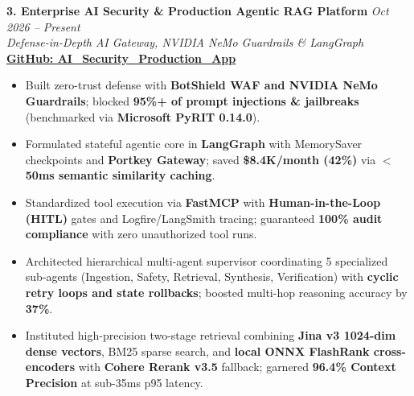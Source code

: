 \documentclass[9.5pt,a4paper]{article}
\begin{document}
\vspace{2.0pt}
\noindent\textbf{3. Enterprise AI Security \& Production Agentic RAG Platform} \hfill {\small\textit{Oct 2026 -- Present}}\\
\textit{Defense-in-Depth AI Gateway, NVIDIA NeMo Guardrails \& LangGraph} \hfill {\footnotesize\href{https://github.com/KishorKumarParoi/AI_Security_Production_App}{\textbf{GitHub: AI\_Security\_Production\_App}}}
\begin{itemize}
    \item Built zero-trust defense with \textbf{BotShield WAF and NVIDIA NeMo Guardrails}; blocked \textbf{95\%+ of prompt injections \& jailbreaks} (benchmarked via \textbf{Microsoft PyRIT 0.14.0}).
    \item Formulated stateful agentic core in \textbf{LangGraph} with MemorySaver checkpoints and \textbf{Portkey Gateway}; saved \textbf{\$8.4K/month (42\%)} via \textbf{$<$50ms semantic similarity caching}.
    \item Standardized tool execution via \textbf{FastMCP} with \textbf{Human-in-the-Loop (HITL)} gates and Logfire/LangSmith tracing; guaranteed \textbf{100\% audit compliance} with zero unauthorized tool runs.
    \item Architected hierarchical multi-agent supervisor coordinating 5 specialized sub-agents (Ingestion, Safety, Retrieval, Synthesis, Verification) with \textbf{cyclic retry loops and state rollbacks}; boosted multi-hop reasoning accuracy by \textbf{37\%}.
    \item Instituted high-precision two-stage retrieval combining \textbf{Jina v3 1024-dim dense vectors}, BM25 sparse search, and \textbf{local ONNX FlashRank cross-encoders} with \textbf{Cohere Rerank v3.5} fallback; garnered \textbf{96.4\% Context Precision} at sub-35ms p95 latency.
\end{itemize}

\pagebreak
\end{document}
